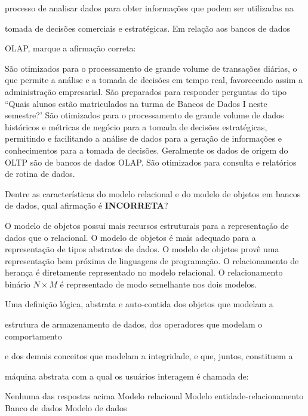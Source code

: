\documentclass[12pt, addpoints]{exam}
\begin{document}
\begin{questions}
processo de analisar dados para obter informações que podem ser utilizadas na

tomada de decisões comerciais e estratégicas. Em relação aos bancos de dados

OLAP, marque a afirmação correta:
\begin{choices}
\choice São otimizados para o processamento de grande volume de transações diárias, o que permite a análise e a tomada de decisões em tempo real, favorecendo assim a administração empresarial.
\choice São preparados para responder perguntas do tipo ``Quais alunos estão matriculados na turma de Bancos de Dados I neste semestre?'
\choice São otimizados para o processamento de grande volume de dados históricos e métricas de negócio para a tomada de decisões estratégicas, permitindo e facilitando a análise de dados para a geração de informações e conhecimentos para a tomada de decisões.
\choice Geralmente os dados de origem do OLTP são de bancos de dados OLAP.
\choice São otimizados para consulta e relatórios de rotina de dados.
\end{choices}

\question

Dentre as características do modelo relacional e do modelo de objetos em bancos de dados, qual afirmação é \textbf{INCORRETA}?


\begin{choices}
\choice O modelo de objetos possui mais recursos estruturais para a representação de dados que o relacional.
\choice O modelo de objetos é mais adequado para a representação de tipos abstratos de dados.
\choice O modelo de objetos provê uma representação bem próxima de linguagens de programação.
\choice O relacionamento de herança é diretamente representado no modelo relacional.
\choice O relacionamento binário \( N \times M \) é representado de modo semelhante nos dois modelos.	
\end{choices}

\question

Uma definição lógica, abstrata e auto-contida dos objetos que modelam a

estrutura de armazenamento de dados, dos operadores que modelam o comportamento

e dos demais conceitos que modelam a integridade, e que, juntos, constituem a

máquina abstrata com a qual os usuários interagem é chamada de:


\begin{choices}
\choice Nenhuma das respostas acima
\choice Modelo relacional
\choice Modelo entidade-relacionamento
\choice Banco de dados
\choice Modelo de dados
\end{choices}


\end{questions}
\end{document}
